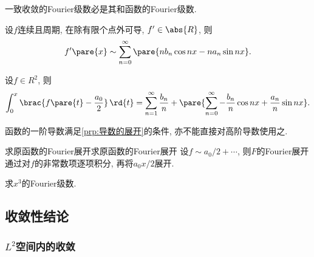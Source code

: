 \documentclass[hidelinks]{ctexart}
\begin{document}
\begin{finale}
    \begin{proposition}[和函数的展开]
        一致收敛的Fourier级数必是其和函数的Fourier级数.
    \end{proposition}
    \begin{proposition}[导数的展开]
        \label{prp:导数的展开}
        设$f$连续且周期, 在除有限个点外可导, $f'\in\abs{R}$, 则
        \begin{equation}
            \label{eq:导数的展开}
            f'\pare{x} \sim \sum_{n=0}^\infty \pare{nb_n\cos nx - na_n\sin nx}.
        \end{equation}
    \end{proposition}
    \begin{proposition}[积分的展开]
        \label{prop:积分的展开}
        设$f\in R^2$, 则
        \[ \int_0^x \brac{f\pare{t}-\frac{a_0}{2}}\,\rd{t} = \sum_{n=1}^\infty \frac{b_n}{n} + \pare{\sum_{n=0}^\infty -\frac{b_n}{n}\cos nx + \frac{a_n}{n}\sin nx}. \]
    \end{proposition}
\end{finale}

\begin{pitfall}
    函数的一阶导数满足\cref{prp:导数的展开}的条件, 亦不能直接对高阶导数使用之.
\end{pitfall}

\begin{reflex}{求原函数的Fourier展开}{求原函数的Fourier展开}
    设$f\sim a_0/2+\cdots$, 则$F$的Fourier展开通过对$f$的非常数项逐项积分, 再将$a_0x/2$展开.
\end{reflex}

\begin{ex}
    求$x^3$的Fourier级数.
\end{ex}



\subsection{收敛性结论} %
\label{sub:收敛性结论}

\subsubsection{\texorpdfstring{$L^2$}{L2}空间内的收敛} %
\label{ssub:L2空间内的收敛}
\end{document}
